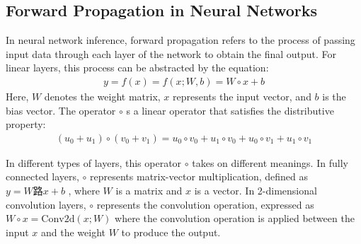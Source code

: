 ﻿\documentclass[conference]{IEEEtran}
\begin{document}
\subsection{Forward Propagation in Neural Networks}

In neural network inference, forward propagation refers to the process of passing input data through each layer of the network to obtain the final output. For linear layers, this process can be abstracted by the equation:
\begin{equation*}
\begin{array}{c}
       y=f(x)=f(x;W,b)=W\circ x+b
\end{array}
\end{equation*}
Here, $W$ denotes the weight matrix, $x$ represents the input vector, and $b$ is the bias vector. The operator $\circ$ s a linear operator that satisfies the distributive property:
\begin{equation*}
\begin{array}{c}
       (u_0+u_1) \circ (v_0+v_1)=u_0 \circ v_0+u_1 \circ v_0+ u_0\circ v_1+ u_1\circ v_1
\end{array}
\end{equation*}

In different types of layers, this operator $\circ$ takes on different meanings. In fully connected layers, $\circ$ represents matrix-vector multiplication, defined as $y=W路x+b$ , where $W$ is a matrix and $x$ is a vector. In 2-dimensional convolution layers, $\circ$ represents the convolution operation, expressed as $W\circ x=\text{Conv}2\text{d}(x;W)$ where the convolution operation is applied between the input $x$ and the weight $W$ to produce the output.
\end{document}
